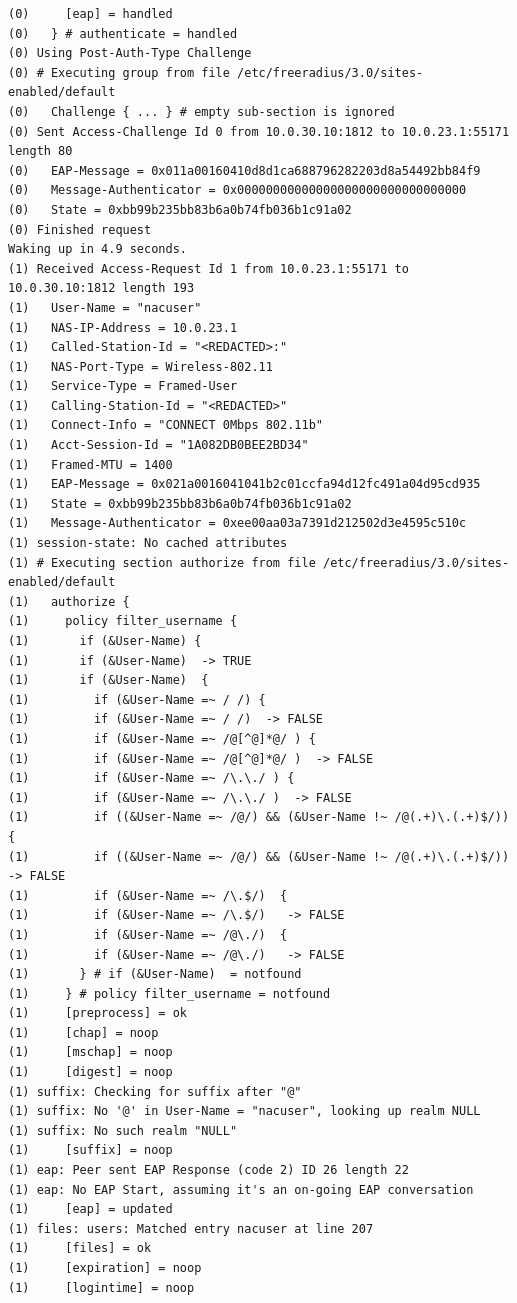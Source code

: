 \documentclass[11pt]{article}
\begin{document}
\begin{verbatim}
(0)     [eap] = handled
(0)   } # authenticate = handled
(0) Using Post-Auth-Type Challenge
(0) # Executing group from file /etc/freeradius/3.0/sites-enabled/default
(0)   Challenge { ... } # empty sub-section is ignored
(0) Sent Access-Challenge Id 0 from 10.0.30.10:1812 to 10.0.23.1:55171 length 80
(0)   EAP-Message = 0x011a00160410d8d1ca688796282203d8a54492bb84f9
(0)   Message-Authenticator = 0x00000000000000000000000000000000
(0)   State = 0xbb99b235bb83b6a0b74fb036b1c91a02
(0) Finished request
Waking up in 4.9 seconds.
(1) Received Access-Request Id 1 from 10.0.23.1:55171 to 10.0.30.10:1812 length 193
(1)   User-Name = "nacuser"
(1)   NAS-IP-Address = 10.0.23.1
(1)   Called-Station-Id = "<REDACTED>:"
(1)   NAS-Port-Type = Wireless-802.11
(1)   Service-Type = Framed-User
(1)   Calling-Station-Id = "<REDACTED>"
(1)   Connect-Info = "CONNECT 0Mbps 802.11b"
(1)   Acct-Session-Id = "1A082DB0BEE2BD34"
(1)   Framed-MTU = 1400
(1)   EAP-Message = 0x021a0016041041b2c01ccfa94d12fc491a04d95cd935
(1)   State = 0xbb99b235bb83b6a0b74fb036b1c91a02
(1)   Message-Authenticator = 0xee00aa03a7391d212502d3e4595c510c
(1) session-state: No cached attributes
(1) # Executing section authorize from file /etc/freeradius/3.0/sites-enabled/default
(1)   authorize {
(1)     policy filter_username {
(1)       if (&User-Name) {
(1)       if (&User-Name)  -> TRUE
(1)       if (&User-Name)  {
(1)         if (&User-Name =~ / /) {
(1)         if (&User-Name =~ / /)  -> FALSE
(1)         if (&User-Name =~ /@[^@]*@/ ) {
(1)         if (&User-Name =~ /@[^@]*@/ )  -> FALSE
(1)         if (&User-Name =~ /\.\./ ) {
(1)         if (&User-Name =~ /\.\./ )  -> FALSE
(1)         if ((&User-Name =~ /@/) && (&User-Name !~ /@(.+)\.(.+)$/))  {
(1)         if ((&User-Name =~ /@/) && (&User-Name !~ /@(.+)\.(.+)$/))   -> FALSE
(1)         if (&User-Name =~ /\.$/)  {
(1)         if (&User-Name =~ /\.$/)   -> FALSE
(1)         if (&User-Name =~ /@\./)  {
(1)         if (&User-Name =~ /@\./)   -> FALSE
(1)       } # if (&User-Name)  = notfound
(1)     } # policy filter_username = notfound
(1)     [preprocess] = ok
(1)     [chap] = noop
(1)     [mschap] = noop
(1)     [digest] = noop
(1) suffix: Checking for suffix after "@"
(1) suffix: No '@' in User-Name = "nacuser", looking up realm NULL
(1) suffix: No such realm "NULL"
(1)     [suffix] = noop
(1) eap: Peer sent EAP Response (code 2) ID 26 length 22
(1) eap: No EAP Start, assuming it's an on-going EAP conversation
(1)     [eap] = updated
(1) files: users: Matched entry nacuser at line 207
(1)     [files] = ok
(1)     [expiration] = noop
(1)     [logintime] = noop

\end{verbatim}
\end{document}
